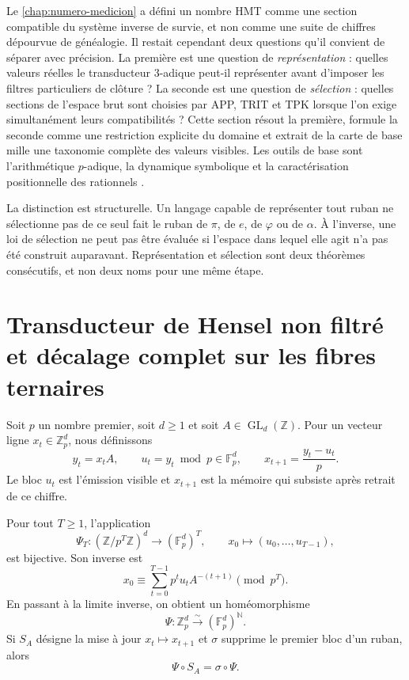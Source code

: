 \label{chap:cobertura-taxonomia-numeros}

Le \cref{chap:numero-medicion} a défini un nombre HMT comme une section
compatible du système inverse de survie, et non comme une suite de
chiffres dépourvue de généalogie. Il restait cependant deux questions qu'il
convient de séparer avec précision. La première est une question de
\emph{représentation} : quelles valeurs réelles le transducteur
3-adique peut-il représenter avant d'imposer les filtres particuliers de clôture ? La seconde est
une question de \emph{sélection} : quelles sections de l'espace brut sont
choisies par APP, TRIT et TPK lorsque l'on exige simultanément leurs
compatibilités ? Cette section résout la première, formule la seconde comme
une restriction explicite du domaine et extrait de la carte de base mille une
taxonomie complète des valeurs visibles. Les outils de base sont
l'arithmétique \(p\)-adique, la dynamique symbolique et la caractérisation positionnelle
des rationnels \cite{Koblitz1984,LindMarcus1995,HardyWright2008}.

La distinction est structurelle. Un langage capable de représenter tout ruban ne
sélectionne pas de ce seul fait le ruban de \(\pi\), de \(e\), de \(\varphi\) ou
de \(\alpha\). À l'inverse, une loi de sélection ne peut pas être évaluée si
l'espace dans lequel elle agit n'a pas été construit auparavant. Représentation et sélection
sont deux théorèmes consécutifs, et non deux noms pour une même étape.

\section{Transducteur de Hensel non filtré et décalage complet sur les fibres ternaires}

Soit \(p\) un nombre premier, soit \(d\geq1\) et soit
\(A\in\operatorname{GL}_d(\mathbb Z)\). Pour un vecteur ligne
\(x_t\in\mathbb Z_p^d\), nous définissons
\begin{equation}
 y_t=x_tA,
 \qquad
 u_t=y_t\bmod p\in\mathbb F_p^d,
 \qquad
 x_{t+1}=\frac{y_t-u_t}{p}.
 \label{eq:transductor-hensel-general}
\end{equation}
Le bloc \(u_t\) est l'émission visible et \(x_{t+1}\) est la mémoire qui
subsiste après retrait de ce chiffre.

\begin{theorem}
\label{thm:shift-hensel-completo}
Pour tout \(T\geq1\), l'application
\[
 \Psi_T:(\mathbb Z/p^T\mathbb Z)^d
 \longrightarrow(\mathbb F_p^d)^T,
 \qquad
 x_0\longmapsto(u_0,\ldots,u_{T-1}),
\]
est bijective. Son inverse est
\begin{equation}
 x_0\equiv
 \sum_{t=0}^{T-1}p^t u_tA^{-(t+1)}
 \pmod {p^T}.
 \label{eq:inversa-hensel-finita}
\end{equation}
En passant à la limite inverse, on obtient un homéomorphisme
\[
 \Psi:\mathbb Z_p^d\xrightarrow{\ \sim\ }
 (\mathbb F_p^d)^{\mathbb N}.
\]
Si \(S_A\) désigne la mise à jour \(x_t\mapsto x_{t+1}\) et
\(\sigma\) supprime le premier bloc d'un ruban, alors
\[
 \Psi\circ S_A=\sigma\circ\Psi.
\]
\end{theorem}


